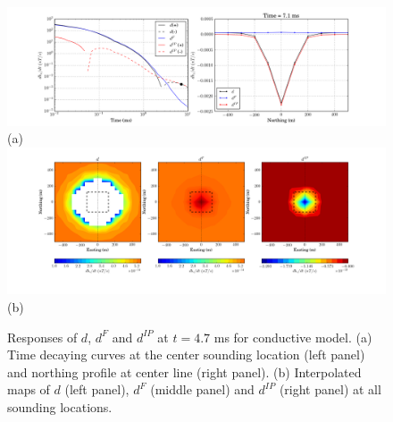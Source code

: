 \documentclass[a4paper, 11pt]{article}
\begin{document}
\begin{figure}[htb]
  \centering
  \includegraphics[height=0.2\textheight]{figures/synthetic/EMIPCase2_ch38_profile.png} \\ (a)
  \\
  \includegraphics[height=0.25\textheight]{figures/synthetic/EMIPCase2_ch38_plan.png} \\ (b)
  \caption{Responses of $d$, $d^{F}$ and $d^{IP}$ at $t=4.7$ ms for conductive model. (a) Time decaying curves at the center sounding location (left panel) and northing profile at center line (right panel). (b) Interpolated maps of $d$ (left panel), $d^{F}$ (middle panel) and $d^{IP}$ (right panel) at all sounding locations. }
  \label{F: EMIPresp2_case2}
\end{figure}
\end{document}
